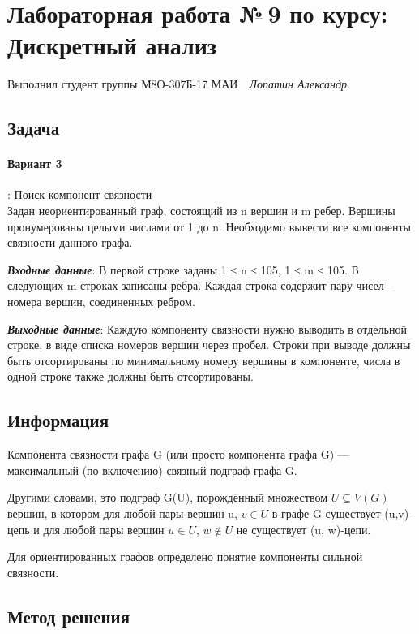 \documentclass[12pt]{article}
\begin{document}
\section*{\centering Лабораторная работа №\,9 по курсу:\\ Дискретный анализ}

Выполнил студент группы М8О-307Б-17 МАИ \,\, \textit{Лопатин Александр}.

\subsection*{Задача}

\paragraph*{Вариант 3}: Поиск компонент связности\\
Задан неориентированный граф, состоящий из n вершин и m ребер.
Вершины пронумерованы целыми числами от 1 до n. Необходимо
вывести все компоненты связности данного графа.

\textit{ \textbf{Входные данные}}: 
В первой строке заданы 1 ≤ n ≤ 105, 1 ≤ m ≤ 105. В
следующих m строках записаны ребра. Каждая строка содержит пару
чисел – номера вершин, соединенных ребром.


\textit{ \textbf{Выходные данные}}: 
Каждую компоненту связности нужно выводить в отдельной строке, в
виде списка номеров вершин через пробел. Строки при выводе должны
быть отсортированы по минимальному номеру вершины в компоненте,
числа в одной строке также должны быть отсортированы.

\subsection*{Информация}

Компонента связности графа G (или просто компонента графа G) — максимальный (по включению) связный подграф графа G.

Другими словами, это подграф  G(U), порождённый множеством   $U \subseteq V(G)$ вершин, в котором для любой пары вершин  u, $v \in U$ в графе   G существует  (u,v)-цепь и для любой пары вершин  $u\in U$,  $w \notin U$ не существует  (u, w)-цепи.

Для ориентированных графов определено понятие компоненты сильной связности.



\subsection*{Метод решения}
\end{document}

